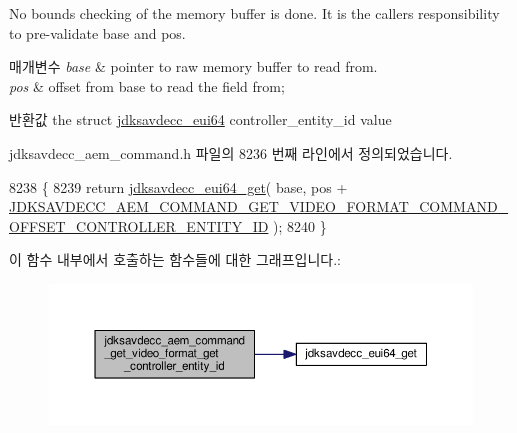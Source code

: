 No bounds checking of the memory buffer is done. It is the caller\textquotesingle{}s responsibility to pre-\/validate base and pos.


\begin{DoxyParams}{매개변수}
{\em base} & pointer to raw memory buffer to read from. \\
\hline
{\em pos} & offset from base to read the field from; \\
\hline
\end{DoxyParams}
\begin{DoxyReturn}{반환값}
the struct \hyperlink{structjdksavdecc__eui64}{jdksavdecc\+\_\+eui64} controller\+\_\+entity\+\_\+id value 
\end{DoxyReturn}


jdksavdecc\+\_\+aem\+\_\+command.\+h 파일의 8236 번째 라인에서 정의되었습니다.


\begin{DoxyCode}
8238 \{
8239     \textcolor{keywordflow}{return} \hyperlink{group__eui64_ga2652311a25a6b91cddbed75c108c7031}{jdksavdecc\_eui64\_get}( base, pos + 
      \hyperlink{group__command__get__video__format_ga6f350f4b3fa21a6442e1ebbd649a9277}{JDKSAVDECC\_AEM\_COMMAND\_GET\_VIDEO\_FORMAT\_COMMAND\_OFFSET\_CONTROLLER\_ENTITY\_ID}
       );
8240 \}
\end{DoxyCode}


이 함수 내부에서 호출하는 함수들에 대한 그래프입니다.\+:
\nopagebreak
\begin{figure}[H]
\begin{center}
\leavevmode
\includegraphics[width=350pt]{group__command__get__video__format_gaaae4a77c345d3c008014a3e2172ec886_cgraph}
\end{center}
\end{figure}


